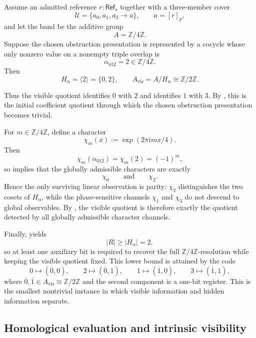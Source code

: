 \begin{example}\label{ex:one-bit-hidden-obstruction}
Assume an admitted reference $r:\mathsf{Ref}_s$ together with a three-member cover
\[
\mathcal U=\{a_0,a_1,a_2\to a\},
\qquad
a=[r]_p,
\]
and let the band be the additive group
\[
A=\mathbb Z/4\mathbb Z.
\]
Suppose the chosen obstruction presentation is represented by a cocycle whose only nonzero value on a nonempty triple overlap is
\[
\alpha_{012}=2\in \mathbb Z/4\mathbb Z.
\]
Then
\[
H_\alpha=\langle 2\rangle=\{0,2\},
\qquad
A_{\mathrm{vis}}=A/H_\alpha\cong \mathbb Z/2\mathbb Z.
\]

Thus the visible quotient identifies $0$ with $2$ and identifies $1$ with $3$. By , this is the initial coefficient quotient through which the chosen obstruction presentation becomes trivial.

For $m\in\mathbb Z/4\mathbb Z$, define a character
\[
\chi_m(x):=\exp(2\pi i mx/4).
\]
Then
\[
\chi_m(\alpha_{012})=\chi_m(2)=(-1)^m,
\]
so  implies that the globally admissible characters are exactly
\[
\chi_0
\qquad\text{and}\qquad
\chi_2.
\]
Hence the only surviving linear observation is parity: $\chi_2$ distinguishes the two cosets of $H_\alpha$, while the phase-sensitive channels $\chi_1$ and $\chi_3$ do not descend to global observables. By , the visible quotient is therefore exactly the quotient detected by all globally admissible character channels.

Finally,  yields
\[
|R|\ge |H_\alpha|=2,
\]
so at least one auxiliary bit is required to recover the full $\mathbb Z/4\mathbb Z$-resolution while keeping the visible quotient fixed. This lower bound is attained by the code
\[
0\mapsto (\overline{0},0),\qquad
2\mapsto (\overline{0},1),\qquad
1\mapsto (\overline{1},0),\qquad
3\mapsto (\overline{1},1),
\]
where $\overline{0},\overline{1}\in A_{\mathrm{vis}}\cong \mathbb Z/2\mathbb Z$ and the second component is a one-bit register. This is the smallest nontrivial instance in which visible information and hidden information separate.
\end{example}

\subsection{Homological evaluation and intrinsic visibility}

